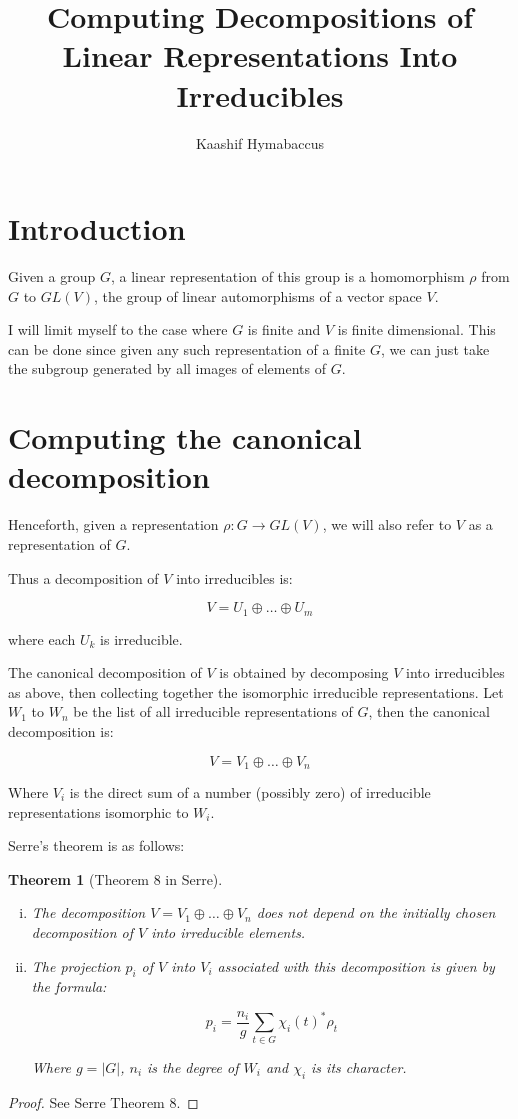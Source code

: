 \documentclass{article}
\title{Computing Decompositions of Linear Representations Into Irreducibles}
\author{Kaashif Hymabaccus}
\newtheorem*{theorem}{Theorem}
\begin{document}
\maketitle
\tableofcontents
\newpage

\section{Introduction}

Given a group $G$, a linear representation of this group is a
homomorphism $\rho$ from $G$ to $GL(V)$, the group of linear
automorphisms of a vector space $V$.

I will limit myself to the case where $G$ is finite and $V$ is finite
dimensional. This can be done since given any such representation of a
finite $G$, we can just take the subgroup generated by all images of
elements of $G$.

\section{Computing the canonical decomposition}

Henceforth, given a representation $\rho : G \to GL(V)$, we will also
refer to $V$ as a representation of $G$.

Thus a decomposition of $V$ into irreducibles is:

$$V = U_1 \oplus \ldots \oplus U_m$$

where each $U_k$ is irreducible.

The canonical decomposition of $V$ is obtained by decomposing $V$ into
irreducibles as above, then collecting together the isomorphic
irreducible representations. Let $W_1$ to $W_n$ be the list of all
irreducible representations of $G$, then the canonical decomposition is:

$$V = V_1 \oplus \ldots \oplus V_n$$

Where $V_i$ is the direct sum of a number (possibly zero) of
irreducible representations isomorphic to $W_i$.

Serre's theorem is as follows:
\vspace{0.5em}

\begin{theorem}[Theorem 8 in Serre]\ \\
\vspace{-1em}
\begin{enumerate}[(i)]
  \item The decomposition $V = V_1 \oplus \ldots \oplus V_n$ does not
    depend on the initially chosen decomposition of $V$ into
    irreducible elements.
  \item The projection $p_i$ of $V$ into $V_i$ associated with this
    decomposition is given by the formula:

    $$p_i = \frac{n_i}{g} \sum_{t \in G}\chi_i(t)^*\rho_t$$

    Where $g = |G|$, $n_i$ is the degree of $W_i$ and $\chi_i$ is its
    character.
\end{enumerate}
\end{theorem}
\begin{proof}
See Serre Theorem 8.
\end{proof}
\end{document}
